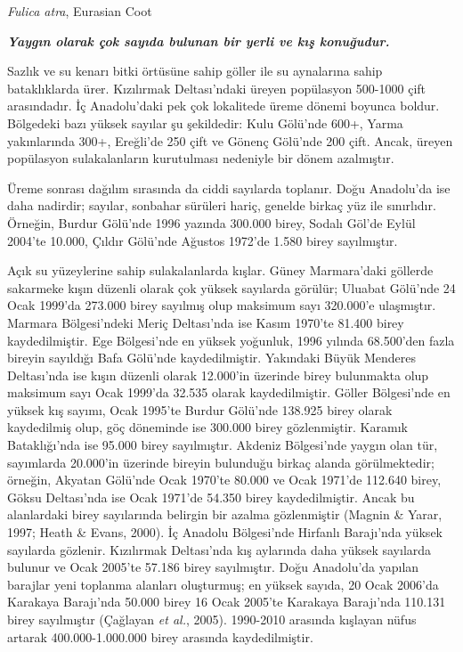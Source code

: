 \documentclass[
  a4paper,
  DIV=11,
  numbers=noendperiod]{scrreprt}
\begin{document}
\emph{Fulica atra}, Eurasian Coot

\textbf{\emph{Yaygın olarak çok sayıda bulunan bir yerli ve kış
konuğudur.}}

Sazlık ve su kenarı bitki örtüsüne sahip göller ile su aynalarına sahip
bataklıklarda ürer. Kızılırmak Deltası'ndaki üreyen popülasyon 500-1000
çift arasındadır. İç Anadolu'daki pek çok lokalitede üreme dönemi
boyunca boldur. Bölgedeki bazı yüksek sayılar şu şekildedir: Kulu
Gölü'nde 600+, Yarma yakınlarında 300+, Ereğli'de 250 çift ve Gönenç
Gölü'nde 200 çift. Ancak, üreyen popülasyon sulakalanların kurutulması
nedeniyle bir dönem azalmıştır.

Üreme sonrası dağılım sırasında da ciddi sayılarda toplanır. Doğu
Anadolu'da ise daha nadirdir; sayılar, sonbahar sürüleri hariç, genelde
birkaç yüz ile sınırlıdır. Örneğin, Burdur Gölü'nde 1996 yazında 300.000
birey, Sodalı Göl'de Eylül 2004'te 10.000, Çıldır Gölü'nde Ağustos
1972'de 1.580 birey sayılmıştır.

Açık su yüzeylerine sahip sulakalanlarda kışlar. Güney Marmara'daki
göllerde sakarmeke kışın düzenli olarak çok yüksek sayılarda görülür;
Uluabat Gölü'nde 24 Ocak 1999'da 273.000 birey sayılmış olup maksimum
sayı 320.000'e ulaşmıştır. Marmara Bölgesi'ndeki Meriç Deltası'nda ise
Kasım 1970'te 81.400 birey kaydedilmiştir. Ege Bölgesi'nde en yüksek
yoğunluk, 1996 yılında 68.500'den fazla bireyin sayıldığı Bafa Gölü'nde
kaydedilmiştir. Yakındaki Büyük Menderes Deltası'nda ise kışın düzenli
olarak 12.000'in üzerinde birey bulunmakta olup maksimum sayı Ocak
1999'da 32.535 olarak kaydedilmiştir. Göller Bölgesi'nde en yüksek kış
sayımı, Ocak 1995'te Burdur Gölü'nde 138.925 birey olarak kaydedilmiş
olup, göç döneminde ise 300.000 birey gözlenmiştir. Karamık
Bataklığı'nda ise 95.000 birey sayılmıştır. Akdeniz Bölgesi'nde yaygın
olan tür, sayımlarda 20.000'in üzerinde bireyin bulunduğu birkaç alanda
görülmektedir; örneğin, Akyatan Gölü'nde Ocak 1970'te 80.000 ve Ocak
1971'de 112.640 birey, Göksu Deltası'nda ise Ocak 1971'de 54.350 birey
kaydedilmiştir. Ancak bu alanlardaki birey sayılarında belirgin bir
azalma gözlenmiştir (Magnin \& Yarar, 1997; Heath \& Evans, 2000). İç
Anadolu Bölgesi'nde Hirfanlı Barajı'nda yüksek sayılarda gözlenir.
Kızılırmak Deltası'nda kış aylarında daha yüksek sayılarda bulunur ve
Ocak 2005'te 57.186 birey sayılmıştır. Doğu Anadolu'da yapılan barajlar
yeni toplanma alanları oluşturmuş; en yüksek sayıda, 20 Ocak 2006'da
Karakaya Barajı'nda 50.000 birey 16 Ocak 2005'te Karakaya Barajı'nda
110.131 birey sayılmıştır (Çağlayan \emph{et al.}, 2005). 1990-2010
arasında kışlayan nüfus artarak 400.000-1.000.000 birey arasında
kaydedilmiştir.
\end{document}
